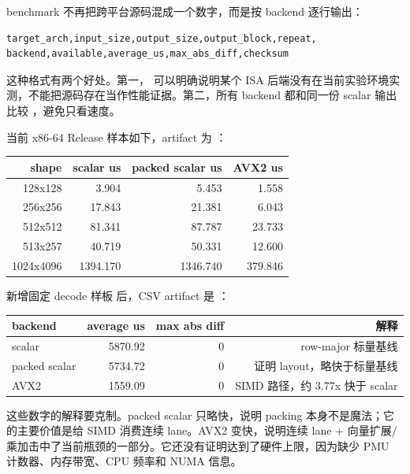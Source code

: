 benchmark 不再把跨平台源码混成一个数字，而是按 backend 逐行输出：

\begin{lstlisting}[numbers=none,caption={LCQI kernel benchmark CSV 字段}]
target_arch,input_size,output_size,output_block,repeat,
backend,available,average_us,max_abs_diff,checksum
\end{lstlisting}

这种格式有两个好处。第一， 可以明确说明某个 ISA 后端没有在当前实验环境实测，不能把源码存在当作性能证据。第二，所有 backend 都和同一份 scalar 输出比较 ，避免只看速度。

当前 x86-64 Release 样本如下，artifact 为 ：

\begin{center}
\begin{tabular}{rrrr}
\toprule
shape & scalar us & packed scalar us & AVX2 us \\
\midrule
128x128 & 3.904 & 5.453 & 1.558 \\
256x256 & 17.843 & 21.381 & 6.043 \\
512x512 & 81.341 & 87.787 & 23.733 \\
513x257 & 40.719 & 50.331 & 12.600 \\
1024x4096 & 1394.170 & 1346.740 & 379.846 \\
\bottomrule
\end{tabular}
\end{center}

新增固定 decode 样板  后，CSV artifact 是 ：

\begin{center}
\begin{tabular}{lrrr}
\toprule
backend & average us & max abs diff & 解释 \\
\midrule
scalar & 5870.92 & 0 & row-major 标量基线 \\
packed scalar & 5734.72 & 0 & 证明 layout，略快于标量基线 \\
AVX2 & 1559.09 & 0 & SIMD 路径，约 3.77x 快于 scalar \\
\bottomrule
\end{tabular}
\end{center}

这些数字的解释要克制。packed scalar 只略快，说明 packing 本身不是魔法；它的主要价值是给 SIMD 消费连续 lane。AVX2 变快，说明连续 lane + 向量扩展/乘加击中了当前瓶颈的一部分。它还没有证明达到了硬件上限，因为缺少 PMU 计数器、内存带宽、CPU 频率和 NUMA 信息。

